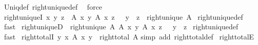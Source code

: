 \begin{isabellebody}
\isamarkupfalse%
\ Uniq{\isacharunderscore}{\kern0pt}def\ right{\isacharunderscore}{\kern0pt}unique{\isacharunderscore}{\kern0pt}def\ \isamarkupfalse%
\ force%
\endisatagproof
{\isafoldproof}%
%
\isadelimproof
\isanewline
%
\endisadelimproof
\isanewline
{}\isamarkupfalse%
\ right{\isacharunderscore}{\kern0pt}uniqueI{\isacharcolon}{\kern0pt}\ {\isachardoublequoteopen}{\isacharparenleft}{\kern0pt}{\isasymAnd}x\ y\ z{\isachardot}{\kern0pt}\ {\isasymlbrakk}\ A\ x\ y{\isacharsemicolon}{\kern0pt}\ A\ x\ z\ {\isasymrbrakk}\ {\isasymLongrightarrow}\ y\ {\isacharequal}{\kern0pt}\ z{\isacharparenright}{\kern0pt}\ {\isasymLongrightarrow}\ right{\isacharunderscore}{\kern0pt}unique\ A{\isachardoublequoteclose}\isanewline
%
\isadelimproof
%
\endisadelimproof
%
\isatagproof
{}\isamarkupfalse%
\ right{\isacharunderscore}{\kern0pt}unique{\isacharunderscore}{\kern0pt}def\ \isamarkupfalse%
\ fast%
\endisatagproof
{\isafoldproof}%
%
\isadelimproof
\isanewline
%
\endisadelimproof
\isanewline
{}\isamarkupfalse%
\ right{\isacharunderscore}{\kern0pt}uniqueD{\isacharcolon}{\kern0pt}\ {\isachardoublequoteopen}{\isasymlbrakk}\ right{\isacharunderscore}{\kern0pt}unique\ A{\isacharsemicolon}{\kern0pt}\ A\ x\ y{\isacharsemicolon}{\kern0pt}\ A\ x\ z\ {\isasymrbrakk}\ {\isasymLongrightarrow}\ y\ {\isacharequal}{\kern0pt}\ z{\isachardoublequoteclose}\isanewline
%
\isadelimproof
%
\endisadelimproof
%
\isatagproof
{}\isamarkupfalse%
\ right{\isacharunderscore}{\kern0pt}unique{\isacharunderscore}{\kern0pt}def\ \isamarkupfalse%
\ fast%
\endisatagproof
{\isafoldproof}%
%
\isadelimproof
\isanewline
%
\endisadelimproof
\isanewline
{}\isamarkupfalse%
\ right{\isacharunderscore}{\kern0pt}totalI{\isacharcolon}{\kern0pt}\ {\isachardoublequoteopen}{\isacharparenleft}{\kern0pt}{\isasymAnd}y{\isachardot}{\kern0pt}\ {\isasymexists}x{\isachardot}{\kern0pt}\ A\ x\ y{\isacharparenright}{\kern0pt}\ {\isasymLongrightarrow}\ right{\isacharunderscore}{\kern0pt}total\ A{\isachardoublequoteclose}\isanewline
%
\isadelimproof
%
\endisadelimproof
%
\isatagproof
{}\isamarkupfalse%
{\isacharparenleft}{\kern0pt}simp\ add{\isacharcolon}{\kern0pt}\ right{\isacharunderscore}{\kern0pt}total{\isacharunderscore}{\kern0pt}def{\isacharparenright}{\kern0pt}%
\endisatagproof
{\isafoldproof}%
%
\isadelimproof
\isanewline
%
\endisadelimproof
\isanewline
{}\isamarkupfalse%
\ right{\isacharunderscore}{\kern0pt}totalE{\isacharcolon}{\kern0pt}\isanewline

\end{isabellebody}
